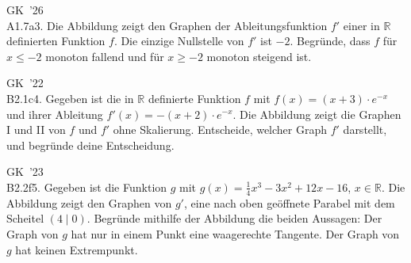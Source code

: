 \documentclass[11pt]{article}
\newcommand{\gzwei}[2]{\par\smallskip\noindent\sbox{\gbox}{#1}%
  \setlength{\gLinks}{\dimexpr\wd\gbox+6mm\relax}%
  \ifdim\gLinks>0.62\linewidth
    \usebox{\gbox}\par\smallskip\noindent\begin{minipage}{\linewidth}#2\end{minipage}%
  \else
    \begin{minipage}[t]{\gLinks}\vspace{0pt}\usebox{\gbox}\end{minipage}%
    \begin{minipage}[t]{\dimexpr\linewidth-\gLinks\relax}\vspace{0pt}\raggedright #2\end{minipage}%
  \fi\par}
\def\gkopfnach{}
\newcommand{\gkopfvor}[1]{\gdef\gkopfnach{#1}}
\newcommand{\karo}[1]{\par\smallskip\noindent\begin{tikzpicture}
  \clip (0,0) rectangle ({\linewidth-1mm},{#1*10mm});
  \draw[black!16,line width=0.3pt,step=5mm] (0,0) grid ({\linewidth},{#1*10mm});
  \end{tikzpicture}\par}
\begin{document}
\gkopfvor{\pfstufekopf{Graph von f$'$ lesen}{\gpunkte[26 23 22]{\textcolor{black!80}{$\bullet$}\,\textcolor{black!25}{$\circ$}\,\textcolor{black!25}{$\circ$}\,\textcolor{black!80}{$\bullet$}\,\textcolor{black!80}{$\bullet$}}}\special{pdf:dest (stufe-graph-von-f-lesen) [@thispage /XYZ @xpos @ypos null]}}
\begin{pfaufg}{GK~’26\\A1.7a}{3.}{\pfohnetr}
Die Abbildung zeigt den Graphen der Ableitungsfunktion $f'$ einer in $\mathbb{R}$ definierten Funktion $f$. Die einzige Nullstelle von $f'$ ist $-2$. Begründe, dass $f$ für $x \le -2$ monoton fallend und für $x \ge -2$ monoton steigend ist.
\gzwei{\begin{abiksys}[xmin=-4,xmax=4,ymin=-3,ymax=4,le=0.7]\funktion[3]{3*(\x+2)*exp(-(\x+1))}{G_{f'}}\end{abiksys}}{\karo{4}}
\end{pfaufg}
\begin{pfaufg}{GK~’22\\B2.1c}{4.}{}
Gegeben ist die in $\mathbb{R}$ definierte Funktion $f$ mit $f(x) = (x + 3) \cdot e^{-x}$ und ihrer Ableitung $f'(x) = -(x + 2) \cdot e^{-x}$. Die Abbildung zeigt die Graphen I und II von $f$ und $f'$ ohne Skalierung. Entscheide, welcher Graph $f'$ darstellt, und begründe deine Entscheidung.
\gzwei{\begin{abiksys}[xmin=-4,xmax=3,ymin=-8,ymax=9,le=0.6,yle=0.18,ohnezahlen,ohnegitter]\funktion[-2.6]{(\x+3)*exp(-\x)}{\mathrm{I}}\funktion[2]{-(\x+2)*exp(-\x)}{\mathrm{II}}\end{abiksys}}{\karo{4}}
\end{pfaufg}
\begin{pfaufg}{GK~’23\\B2.2f}{5.}{}
Gegeben ist die Funktion $g$ mit $g(x) = \tfrac{1}{4}x^3 - 3x^2 + 12x - 16$, $x \in \mathbb{R}$. Die Abbildung zeigt den Graphen von $g'$, eine nach oben geöffnete Parabel mit dem Scheitel $(4 \mid 0)$. Begründe mithilfe der Abbildung die beiden Aussagen: Der Graph von $g$ hat nur in einem Punkt eine waagerechte Tangente. Der Graph von $g$ hat keinen Extrempunkt.
\gzwei{\begin{abiksys}[xmin=0,xmax=7,ymin=0,ymax=6,le=0.7]\funktion[6.6]{0.75*(\x-4)^2}{G_{g'}}\end{abiksys}}{\karo{4}}
\end{pfaufg}
\end{document}
